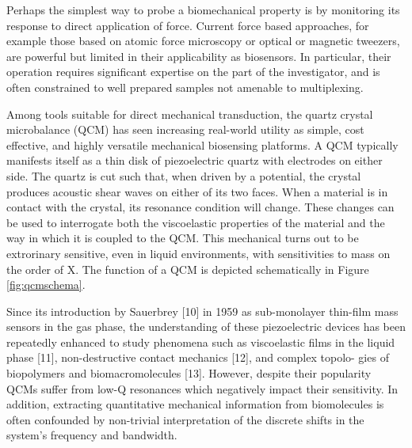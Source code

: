 \documentclass[a4paper,titlepage,onecolumn]{report}
\newcommand{\Figure}[1]{Figure \ref{#1}}
\newcommand{\df}{\Delta\!f}
\newcommand{\dg}{\Delta\Gamma}
\begin{document}
Perhaps the simplest way to probe a biomechanical property is by monitoring
its response to direct application of force. Current force based
approaches, for example those based on atomic force microscopy or optical
or magnetic tweezers, are powerful but limited in their applicability as
biosensors. In particular, their operation requires significant expertise
on the part of the investigator, and is often constrained to well prepared
samples not amenable to multiplexing.

Among tools suitable for direct mechanical transduction, the quartz crystal
microbalance (QCM) has seen increasing real-world utility as simple, cost
effective, and highly versatile mechanical biosensing platforms.  A QCM
typically manifests itself as a thin disk of piezoelectric quartz with
electrodes on either side.  The quartz is cut such that, when driven by a
potential, the crystal produces acoustic shear waves on either of its two
faces.  When a material is in contact with the crystal, its resonance
condition will change.  These changes can be used to interrogate both the
viscoelastic properties of the material and the way in which it is coupled
to the QCM.  This mechanical turns out to be extrorinary sensitive, even in
liquid environments, with sensitivities to mass on the order of X.  The
function of a QCM is depicted schematically in \Figure{fig:qcmschema}.


Since its introduction by Sauerbrey [10] in 1959 as sub-monolayer thin-film
mass sensors in the gas phase, the understanding of these piezoelectric
devices has been repeatedly enhanced to study phenomena such as
viscoelastic films in the liquid phase [11], non-destructive contact
mechanics [12], and complex topolo- gies of biopolymers and
biomacromolecules [13]. However, despite their popularity QCMs suffer from
low-Q resonances which negatively impact their sensitivity. In addition,
extracting quantitative mechanical information from biomolecules is often
confounded by non-trivial interpretation of the discrete shifts in the
system's frequency and bandwidth.
\end{document}
